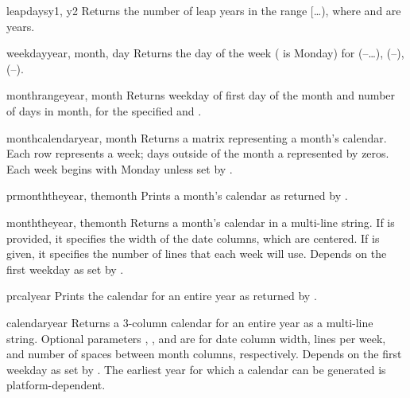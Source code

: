 \begin{funcdesc}{leapdays}{y1, y2}
Returns the number of leap years in the range
[\ldots{}), where  and  are years.
\end{funcdesc}

\begin{funcdesc}{weekday}{year, month, day}
Returns the day of the week ( is Monday) for 
(--\ldots),  (--), 
(--).
\end{funcdesc}

\begin{funcdesc}{monthrange}{year, month}
Returns weekday of first day of the month and number of days in month, 
for the specified  and .
\end{funcdesc}

\begin{funcdesc}{monthcalendar}{year, month}
Returns a matrix representing a month's calendar.  Each row represents
a week; days outside of the month a represented by zeros.
Each week begins with Monday unless set by .
\end{funcdesc}

\begin{funcdesc}{prmonth}{theyear, themonth}
Prints a month's calendar as returned by .
\end{funcdesc}

\begin{funcdesc}{month}{theyear, themonth}
Returns a month's calendar in a multi-line string. If  is
provided, it specifies the width of the date columns, which are
centered. If  is given, it specifies the number of lines that
each week will use. Depends on the first weekday as set by
.
\end{funcdesc}

\begin{funcdesc}{prcal}{year}
Prints the calendar for an entire year as returned by 
.
\end{funcdesc}

\begin{funcdesc}{calendar}{year}
Returns a 3-column calendar for an entire year as a multi-line string.
Optional parameters , , and  are for date column
width, lines per week, and number of spaces between month columns,
respectively. Depends on the first weekday as set by
.  The earliest year for which a calendar can
be generated is platform-dependent.
\end{funcdesc}

